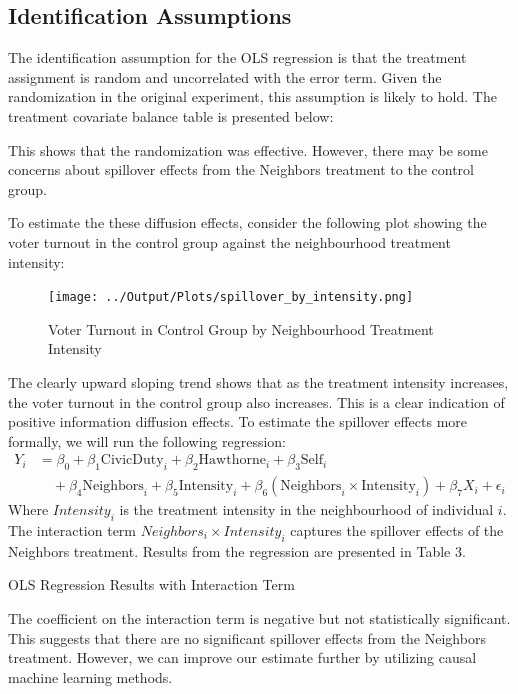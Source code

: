 \documentclass[11pt]{article}
\begin{document}
\subsection{Identification Assumptions}
The identification assumption for the OLS regression is that the treatment assignment is random and uncorrelated with the error term. Given the randomization in the original experiment, this assumption is likely to hold. The treatment covariate balance table is presented below:


This shows that the randomization was effective. However, there may be some concerns about spillover effects from the Neighbors treatment to the control group. 

To estimate the these diffusion effects, consider the following plot showing the voter turnout in the control group against the neighbourhood treatment intensity:
\begin{figure}[H]
    \centering
    \texttt{[image: ../Output/Plots/spillover\_by\_intensity.png]}   
    \caption{Voter Turnout in Control Group by Neighbourhood Treatment Intensity}
    \label{fig:figure2}
\end{figure}

The clearly upward sloping trend shows that as the treatment intensity increases, the voter turnout in the control group also increases. This is a clear indication of positive information diffusion effects. To estimate the spillover effects more formally, we will run the following regression:
\begin{equation}
\begin{split}
Y_i &= \beta_0 + \beta_1 \text{CivicDuty}_i + \beta_2 \text{Hawthorne}_i + \beta_3 \text{Self}_i \\
    &\quad + \beta_4 \text{Neighbors}_i + \beta_5 \text{Intensity}_i + \beta_6 (\text{Neighbors}_i \times \text{Intensity}_i) + \beta_7 X_i + \epsilon_i
\end{split}
\end{equation}
Where $Intensity_i$ is the treatment intensity in the neighbourhood of individual $i$. The interaction term $Neighbors_i \times Intensity_i$ captures the spillover effects of the Neighbors treatment. Results from the regression are presented in Table 3.
\begin{table}[H]
    
    \caption{OLS Regression Results with Interaction Term}        
\end{table}
The coefficient on the interaction term is negative but not statistically significant. This suggests that there are no significant spillover effects from the Neighbors treatment. However, we can improve our estimate further by utilizing causal machine learning methods.
\end{document}
